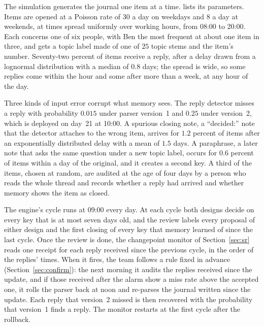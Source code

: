 \documentclass[11pt]{article}
\theoremstyle{definition}
\theoremstyle{plain}
\begin{document}
The simulation generates the journal one item at a time.  lists its parameters.
Items are opened at a Poisson rate of $30$ a day on weekdays and $8$ a day at weekends, at times
spread uniformly over working hours, from 08:00 to 20:00. Each concerns one of six people, with
Ben the most frequent at about one item in three, and gets a topic label made of one of $25$ topic
stems and the item's number. Seventy-two percent of items receive a reply, after a delay drawn from
a lognormal distribution with a median of $0.8$ days; the spread is wide, so some replies come
within the hour and some after more than a week, at any hour of the day.

Three kinds of input error corrupt what memory sees. The reply detector misses a reply with
probability $0.015$ under parser version~1 and $0.25$ under version~2, which is deployed on day~21
at 10:00. A spurious closing note, a ``decided:'' note that the detector attaches to the wrong
item, arrives for $1.2$ percent of items after an exponentially distributed delay with a mean of
$1.5$ days. A paraphrase, a later note that asks the same question under a new topic label, occurs
for $0.6$ percent of items within a day of the original, and it creates a second key. A third of the
items, chosen at random, are audited at the age of four days by a person who reads the whole thread
and records whether a reply had arrived and whether memory shows the item as closed.

The engine's cycle runs at 09:00 every day. At each cycle both designs decide on every key that is
at most seven days old, and the review labels every proposal of either design and the first
closing of every key that memory learned of since the last cycle. Once the review is done, the
changepoint monitor of Section~\ref{sec:sr} reads one receipt for each reply received since the
previous cycle, in the order of the replies' times. When it fires, the team follows a rule fixed in
advance (Section~\ref{sec:confirm}): the next morning it audits the replies received since the
update, and if those received after the alarm show a miss rate above the accepted one, it rolls the
parser back at noon and re-parses the journal written since the update. Each reply that version~2
missed is then recovered with the probability that version~1 finds a reply. The monitor restarts
at the first cycle after the rollback.
\end{document}
